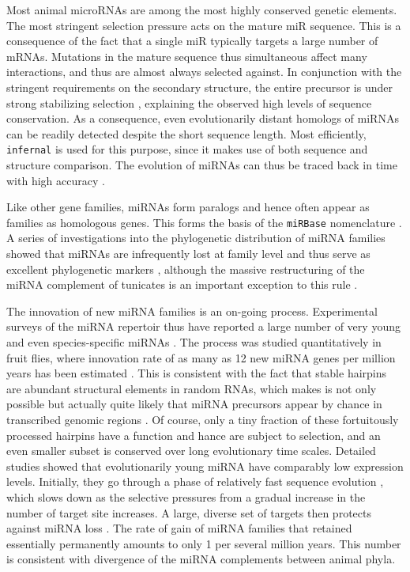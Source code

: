 \documentclass[graybox]{svmult}
\begin{document}
Most animal microRNAs are among the most highly conserved genetic elements.
The most stringent selection pressure acts on the mature miR sequence. This
is a consequence of the fact that a single miR typically targets a large
number of mRNAs. Mutations in the mature sequence thus simultaneous affect
many interactions, and thus are almost always selected against. In
conjunction with the stringent requirements on the secondary structure, the
entire precursor is under strong stabilizing selection \cite{Price:11},
explaining the observed high levels of sequence conservation. As a
consequence, even evolutionarily distant homologs of miRNAs can be readily
detected despite the short sequence length. Most efficiently,
\texttt{infernal} \cite{Nawrocki:13} is used for this purpose, since it
makes use of both sequence and structure comparison.  The evolution of
miRNAs can thus be traced back in time with high accuracy
\cite{Hertel:06a}. 

Like other gene families, miRNAs form paralogs \cite{Tanzer:04a,Hertel:12a}
and hence often appear as families as homologous genes. This forms the
basis of the \texttt{miRBase} nomenclature \cite{Ambrose:03a}. A series of
investigations into the phylogenetic distribution of miRNA families showed
that miRNAs are infrequently lost at family level and thus serve as
excellent phylogenetic markers
\cite{Sempere:06,Heimberg:08,Heimberg:10,Wheeler:09}, although the massive
restructuring of the miRNA complement of tunicates is an important
exception to this rule \cite{Fu:08}.

The innovation of new miRNA families is an on-going process. Experimental
surveys of the miRNA repertoir thus have reported a large number of very
young and even species-specific miRNAs \cite{Bentwich:05,Berezikov:06}. The
process was studied quantitatively in fruit flies, where innovation rate of
as many as 12 new miRNA genes per million years has been estimated
\cite{Lu:08}. This is consistent with the fact that stable hairpins are
abundant structural elements in random RNAs, which makes is not only
possible but actually quite likely that miRNA precursors appear by chance
in transcribed genomic regions \cite{Tanzer:04a,CampoPaysaa:11,Marco:13}.
Of course, only a tiny fraction of these fortuitously processed hairpins
have a function and hance are subject to selection, and an even smaller
subset is conserved over long evolutionary time scales. Detailed studies
showed that evolutionarily young miRNA have comparably low expression
levels. Initially, they go through a phase of relatively fast sequence
evolution \cite{Liang:09,Meunier:12}, which slows down as the selective
pressures from a gradual increase in the number of target site increases. A
large, diverse set of targets then protects against miRNA loss
\cite{Lee:07a}. The rate of gain of miRNA families that retained
essentially permanently amounts to only 1 per several million years. This
number is consistent with divergence of the miRNA complements between
animal phyla.
\end{document}
